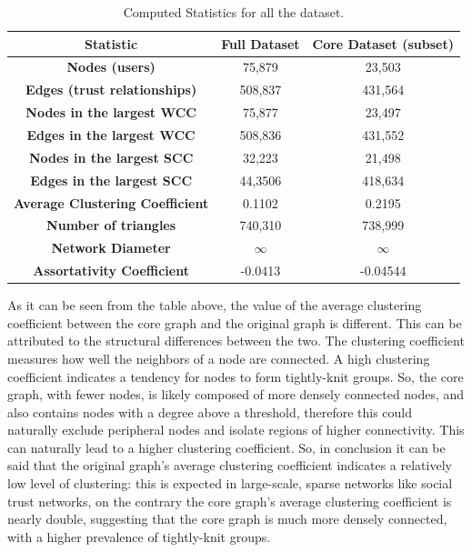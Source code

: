 \documentclass[conference]{IEEEtran}
\begin{document}
\begin{table}[h!]
\centering
\begin{tabular}{|c|c|c|}
\toprule
\textbf{Statistic} & \textbf{Full Dataset} & \textbf{Core Dataset (subset)} \\
\midrule
\textbf{Nodes (users)} & 75,879 & 23,503 \\
\textbf{Edges (trust relationships)} & 508,837 & 431,564\\
\textbf{Nodes in the largest WCC} & 75,877 & 23,497\\
\textbf{Edges in the largest WCC} & 508,836 & 431,552 \\
\textbf{Nodes in the largest SCC} & 32,223 & 21,498 \\
\textbf{Edges in the largest SCC} & 44,3506 & 418,634 \\
\textbf{Average Clustering Coefficient} & 0.1102 & 0.2195 \\
\textbf{Number of triangles} & 740,310 & 738,999 \\
\textbf{Network Diameter} & $\infty$ & $\infty$ \\
\textbf{Assortativity Coefficient} & -0.0413 & -0.04544\\
\bottomrule
\end{tabular}
\caption{Computed Statistics for all the dataset.}
\label{tab:computed_stats}
\end{table}

As it can be seen from the table above, the value of the average clustering coefficient between the core graph and the original graph is different. This can be attributed to the structural differences between the two. The clustering coefficient measures how well the neighbors of a node are connected. A high clustering coefficient indicates a tendency for nodes to form tightly-knit groups. So, the core graph, with fewer nodes, is likely composed of more densely connected nodes, and also contains nodes with a degree above a threshold, therefore this could naturally exclude peripheral nodes and isolate regions of higher connectivity. This can naturally lead to a higher clustering coefficient. So, in conclusion it can be said that the original graph's average clustering coefficient indicates a relatively low level of clustering: this is expected in large-scale, sparse networks like social trust networks, on the contrary the core graph's average clustering coefficient is nearly double, suggesting that the core graph is much more densely connected, with a higher prevalence of tightly-knit groups. 
\end{document}
